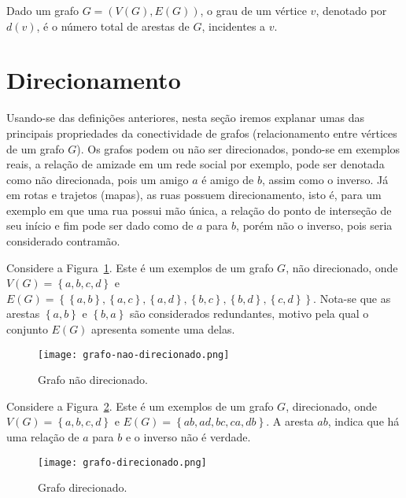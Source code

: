 \begin{definition}
    Dado um grafo $G = (V(G), E(G))$, o grau de um vértice $v$, denotado por $d(v)$, é o número total de arestas de $G$, incidentes a $v$.
\end{definition}


\section{Direcionamento}
Usando-se das definições anteriores, nesta seção iremos explanar umas das principais propriedades da conectividade de grafos (relacionamento entre vértices de um grafo $G$). Os grafos podem ou não ser direcionados, pondo-se em exemplos reais, a relação de amizade em um rede social por exemplo, pode ser denotada como não direcionada, pois um amigo $a$ é amigo de $b$, assim como o inverso. Já em rotas e trajetos (mapas), as ruas possuem direcionamento, isto é, para um exemplo em que uma rua possui mão única, a relação do ponto de interseção de seu início e fim pode ser dado como de $a$ para $b$, porém não o inverso, pois seria considerado contramão.

Considere a Figura~\ref{sec2:ex-grafo-nao-direcionado}. Este é um exemplos de um grafo $G$, não direcionado, onde $V(G) = \left\{a, b, c, d\right\} $ e $E(G) = \left\{\left\{a, b\right\}, \left\{a, c\right\}, \left\{a, d\right\}, \left\{b, c\right\}, \left\{b, d\right\}, \left\{c, d\right\}\right\}$. Nota-se que as arestas $\left\{a, b\right\} $ e $\left\{b, a\right\} $ são considerados redundantes, motivo pela qual o conjunto $E(G)$ apresenta somente uma delas.

\begin{figure}[!htb]
    \centering
    \texttt{[image: grafo-nao-direcionado.png]}
    \caption{Grafo não direcionado.}
    \label{sec2:ex-grafo-nao-direcionado}
\end{figure}

Considere a Figura~\ref{sec2:ex-grafo-direcionado}. Este é um exemplos de um grafo $G$, direcionado, onde $V(G) = \left\{a, b, c, d\right\} $ e $E(G) = \left\{ab, ad, bc, ca, db\right\} $. A aresta $ab$, indica que há uma relação de $a$ para $b$ e o inverso não é verdade.

\begin{figure}
    \centering
    \texttt{[image: grafo-direcionado.png]}
    \caption{Grafo direcionado.}
    \label{sec2:ex-grafo-direcionado}
\end{figure}


